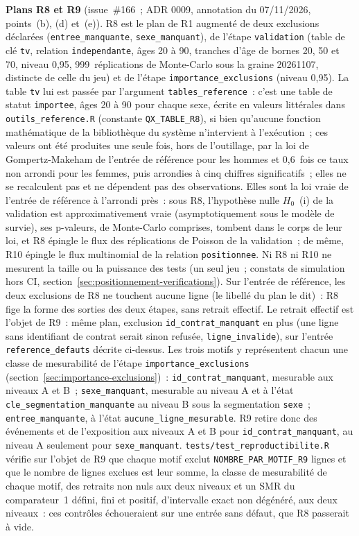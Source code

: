 \documentclass[a4paper,11pt]{article}
\newcommand{\code}[1]{\texttt{\small #1}}
\begin{document}
\noindent
\textbf{Plans R8 et R9} (issue~\#166~; ADR 0009, annotation du
07/11/2026, points~(b), (d) et~(e)). R8 est le plan de R1 augmenté de deux
exclusions déclarées (\code{entree\_manquante}, \code{sexe\_manquant}), de
l'étape \code{validation} (table de clé \code{tv}, relation
\code{independante}, âges 20 à 90, tranches d'âge de bornes 20, 50 et 70,
niveau 0,95, 999~réplications de Monte-Carlo sous la graine 20261107,
distincte de celle du jeu) et de l'étape \code{importance\_exclusions}
(niveau 0,95). La table \code{tv} lui est passée par l'argument
\code{tables\_reference}~: c'est une table de statut \code{importee}, âges
20 à 90 pour chaque sexe, écrite en valeurs littérales dans
\code{outils\_reference.R} (constante \code{QX\_TABLE\_R8}), si bien
qu'aucune fonction mathématique de la bibliothèque du système n'intervient
à l'exécution~; ces valeurs ont été produites une seule fois, hors de
l'outillage, par la loi de Gompertz-Makeham de l'entrée de référence pour
les hommes et 0,6~fois ce taux non arrondi pour les femmes, puis arrondies
à cinq chiffres significatifs~; elles ne se recalculent pas et ne dépendent
pas des observations. Elles sont la loi vraie de l'entrée de référence à
l'arrondi près~: sous R8, l'hypothèse nulle $H_0$~(i) de la validation est
approximativement vraie (asymptotiquement sous le modèle de survie), ses
p-valeurs, de Monte-Carlo comprises, tombent dans le corps de leur loi, et
R8 épingle le flux des réplications de Poisson de la validation~; de même,
R10 épingle le flux multinomial de la relation \code{positionnee}. Ni R8 ni
R10 ne mesurent la taille ou la puissance des tests (un seul jeu~; constats
de simulation hors CI, section~\ref{sec:positionnement-verifications}). Sur l'entrée de référence, les deux exclusions de R8
ne touchent aucune ligne (le libellé du plan le dit)~: R8 fige la forme des
sorties des deux étapes, sans retrait effectif. Le retrait effectif est l'objet de
R9~: même plan, exclusion \code{id\_contrat\_manquant} en plus (une ligne
sans identifiant de contrat serait sinon refusée, \code{ligne\_invalide}),
sur l'entrée \code{reference\_defauts} décrite ci-dessus. Les trois motifs y
représentent chacun une classe de mesurabilité de l'étape
\code{importance\_exclusions} (section~\ref{sec:importance-exclusions})~:
\code{id\_contrat\_manquant}, mesurable aux niveaux A et B~;
\code{sexe\_manquant}, mesurable au niveau A et à l'état
\code{cle\_segmentation\_manquante} au niveau B sous la segmentation
\code{sexe}~; \code{entree\_manquante}, à l'état
\code{aucune\_ligne\_mesurable}. R9 retire donc des événements et de
l'exposition aux niveaux A et B pour \code{id\_contrat\_manquant}, au
niveau A seulement pour \code{sexe\_manquant}.
\code{tests/test\_reproductibilite.R} vérifie sur l'objet de R9 que chaque
motif exclut \code{NOMBRE\_PAR\_MOTIF\_R9} lignes et que le nombre de lignes
exclues est leur somme, la classe de mesurabilité de chaque motif, des retraits
non nuls aux deux niveaux et un SMR du comparateur~1 défini, fini et
positif, d'intervalle exact non dégénéré, aux deux niveaux~: ces contrôles
échoueraient sur une entrée sans défaut, que R8 passerait à vide.
\end{document}
